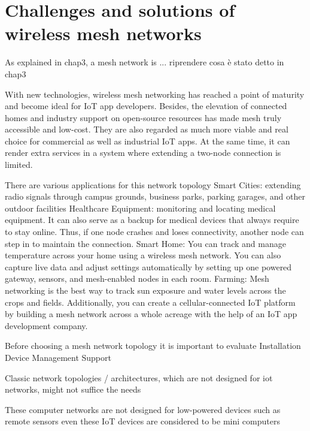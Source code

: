 	\section{Challenges and solutions of wireless mesh networks}
		
		As explained in chap3, a mesh network is ... riprendere cosa è stato detto in chap3
		
		
		With new technologies, wireless mesh networking has reached a point of maturity and become ideal for IoT app developers. Besides, the elevation of connected homes and industry support on open-source resources has made mesh truly accessible and low-cost. They are also regarded as much more viable and real choice for commercial as well as industrial IoT apps. At the same time, it can render extra services in a system where extending a two-node connection is limited.
		
		There are various applications for this network topology
		Smart Cities: extending radio signals through campus grounds, business parks, parking garages, and other outdoor facilities
		Healthcare Equipment: monitoring and locating medical equipment. It can also serve as a backup for medical devices that always require to stay online. Thus, if one node crashes and loses connectivity, another node can step in to maintain the connection.
		Smart Home: You can track and manage temperature across your home using a wireless mesh network. You can also capture live data and adjust settings automatically by setting up one powered gateway, sensors, and mesh-enabled nodes in each room.
		Farming: Mesh networking is the best way to track sun exposure and water levels across the crops and fields. Additionally, you can create a cellular-connected IoT platform by building a mesh network across a whole acreage with the help of an IoT app development company.
	
		Before choosing a mesh network topology it is important to evaluate
		Installation
		Device Management
		Support
	
		Classic network topologies / architectures, which are not designed for iot networks, might not suffice the needs
		
		These computer 
		networks  are  not  designed  for  low-powered  devices  such  as 
		remote  sensors  even  these  IoT  devices  are  considered  to  be 
		mini  computers
		
